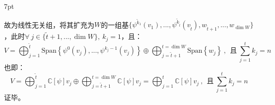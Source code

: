 \documentclass[zihao=-4,UTF8]{report}
\theoremstyle{mystyle} %
\newenvironment{graybox}{%
\def\FrameCommand{%
\hspace{1pt}%
{\color{gray}\small \vrule width 2pt}%
{\color{graybox_color}\vrule width 4pt}%
\colorbox{graybox_color}%
}%
\MakeFramed{\advance\hsize-\width\FrameRestore}%
\noindent\hspace{-4.55pt}%
\begin{adjustwidth}{}{7pt}%
\vspace{2pt}\vspace{2pt}%
}
{%
\vspace{2pt}\end{adjustwidth}\endMakeFramed%
}
\begin{document}
\begin{graybox}
故为线性无关组，将其扩充为$W$的一组基$\{\psi^{\tilde{k}_1}(v_1),...,\psi^{\tilde{k}_{\tilde{t}}}(v_{\tilde{t}}), w_{\tilde{t}+1},...,w_{\dim W}\}$，此时$\forall \ j \in \{\tilde{t}+1,...,\dim W\},\ k_j = 1$，且：
\begin{equation*}
V =  \bigoplus_{j =1}^{\tilde{t}} \text{Span}\left\{ \psi^0(v_j),...,\psi^{k_j-1}(v_j)\right\}\oplus \bigoplus_{j =\tilde{t}+1}^{t = \dim W} \text{Span}\left\{ w_j\right\} \ ,\ \ \text{且}\ \sum_{j=1}^{t}k_j= n
\end{equation*}
也即：
\begin{equation*}
    V =  \bigoplus_{j =1}^{\tilde{t}}\mathbb{C}[\psi]v_j \oplus \bigoplus_{j =\tilde{t}+1}^{t = \dim W} \mathbb{C}[\psi]v_j = \bigoplus_{j =1}^{t}\mathbb{C}[\psi]v_j \ ,\ \ \text{且}\ \sum_{j=1}^{t}k_j= n
\end{equation*}
证毕。
\end{graybox}
\end{document}
